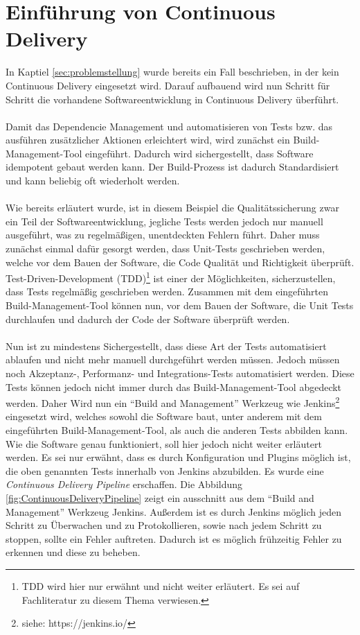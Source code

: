 \section{Einführung von Continuous Delivery}
\label{subsec:EinfuehrungCD}
In Kaptiel \ref{sec:problemstellung}  wurde bereits ein Fall beschrieben, in der kein Continuous Delivery eingesetzt wird. Darauf aufbauend wird nun Schritt für Schritt die vorhandene Softwareentwicklung in Continuous Delivery überführt.
\\\\
Damit das Dependencie Management und automatisieren von Tests bzw. das ausführen zusätzlicher Aktionen erleichtert wird, wird zunächst ein Build-Management-Tool eingeführt. Dadurch wird sichergestellt, dass Software idempotent gebaut werden kann. Der Build-Prozess ist dadurch Standardisiert und kann beliebig oft wiederholt werden.
\\\\
Wie bereits erläutert wurde, ist in diesem Beispiel die Qualitätssicherung zwar ein Teil der Softwareentwicklung, jegliche Tests werden jedoch nur manuell ausgeführt, was zu regelmäßigen, unentdeckten Fehlern führt. Daher muss zunächst einmal dafür gesorgt werden, dass Unit-Tests geschrieben werden, welche vor dem Bauen der Software, die Code Qualität und Richtigkeit überprüft.  Test-Driven-Development (TDD)\footnote{TDD wird hier nur erwähnt und nicht weiter erläutert. Es sei auf Fachliteratur zu diesem Thema verwiesen.} ist einer der Möglichkeiten, sicherzustellen, dass Tests regelmäßig geschrieben werden. Zusammen mit dem eingeführten Build-Management-Tool können nun, vor dem Bauen der Software, die Unit Tests durchlaufen und dadurch der Code der Software überprüft werden.
\\\\
Nun ist zu mindestens Sichergestellt, dass diese Art der Tests automatisiert ablaufen und nicht mehr manuell durchgeführt werden müssen. Jedoch müssen noch Akzeptanz-, Performanz- und Integrations-Tests automatisiert werden. Diese Tests können jedoch nicht immer durch das Build-Management-Tool abgedeckt werden. Daher Wird nun ein "`Build and Management"' Werkzeug wie Jenkins\footnote{siehe: https://jenkins.io/} eingesetzt wird, welches sowohl die Software baut, unter anderem mit dem eingeführten Build-Management-Tool, als auch die anderen Tests abbilden kann. Wie die Software genau funktioniert, soll hier jedoch nicht weiter erläutert werden. Es sei nur erwähnt, dass es durch Konfiguration und Plugins möglich ist, die oben genannten Tests innerhalb von Jenkins abzubilden. Es wurde eine \textit{Continuous Delivery Pipeline} erschaffen. Die Abbildung \ref{fig:ContinuousDeliveryPipeline}  zeigt ein ausschnitt aus dem "`Build and Management"' Werkzeug Jenkins. Außerdem ist es durch Jenkins möglich jeden Schritt zu Überwachen und zu Protokollieren, sowie nach jedem Schritt zu stoppen, sollte ein Fehler auftreten. Dadurch ist es möglich frühzeitig Fehler zu erkennen und diese zu beheben.
